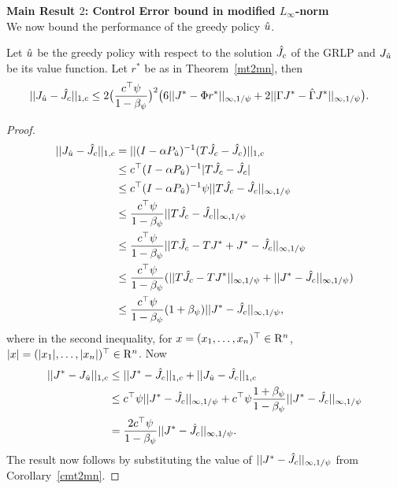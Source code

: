 \textbf{Main Result $2$: Control Error bound in modified $L_\infty$-norm}\\
We now bound the performance of the greedy policy $\hat{u}$.
\begin{theorem}\label{polthe}
Let $\hat{u}$ be the greedy policy with respect to the solution $\hat{J}_c$ of the GRLP and $J_{\hat{u}}$ be its value function. Let $r^*$ be as in Theorem~\ref{mt2mn}, then
\begin{align}\label{polthebnd}
||J_{\hu}-\hj||_{1,c}&\leq 2\big(\frac{c^\top \psi}{1-\beta_{\psi}}\big)^2 \big(6 ||J^*-\Phi r^*||_{\mn}
+2||\Gamma J^*-\hg J^*||_{\mn}\big).
\end{align}
\end{theorem}
\begin{proof}
\begin{align}\label{polderv}
||J_{\hu}-\hj||_{1,c}&=||(I-\alpha P_{\hu})^{-1}(T\hj-\hj)||_{1,c}\nn\\
&\leq c^\top(I-\alpha P_{\hu})^{-1}|T\hj-\hj|\nn\\
&\leq c^\top (I-\alpha P_{\hu})^{-1} \psi ||T\hj-\hj||_{\mn}\nn\\
&\leq \frac{c^\top \psi}{1-\beta_{\psi}}||T\hj-\hj||_{\mn}\nn\\
&\leq \frac{c^\top \psi}{1-\beta_{\psi}}||T\hj-TJ^* +J^*- \hj||_{\mn}\nn\\
&\leq \frac{c^\top \psi}{1-\beta_{\psi}}(||T\hj-TJ^*||_{\mn} +||J^*- \hj||_{\mn})\nn\\
&\leq \frac{c^\top \psi}{1-\beta_{\psi}}(1+\beta_{\psi})||J^*- \hj||_{\mn},
\end{align}
where in the second inequality, for $x=(x_1,\ldots,x_n)^\top\in \mathrm{R}^n$, $|x|=(|x_1|,\ldots,|x_n|)^\top\in \mathrm{R}^n$. Now
\begin{align}
||J^*-J_{\hat{u}}||_{1,c}&\leq ||J^*-\hat{J}_c||_{1,c}+||J_{\hat{u}}-\hat{J}_c||_{1,c}\nonumber\\
&\leq c^\top \psi ||J^*-\hat{J}_c||_{\infty,1/\psi}+c^\top \psi\frac{1+\beta_\psi}{1-\beta_\psi}||J^*- \hat{J}_c||_{\infty,1/\psi}\nonumber\\
&=\frac{2c^\top \psi}{1-\beta_{\psi}}||J^*- \hat{J}_c||_{\infty,1/\psi}.
\end{align}
The result now follows by substituting the value of $||J^*- \hat{J}_c||_{\infty,1/\psi}$ from Corollary~\ref{cmt2mn}.
\end{proof}
